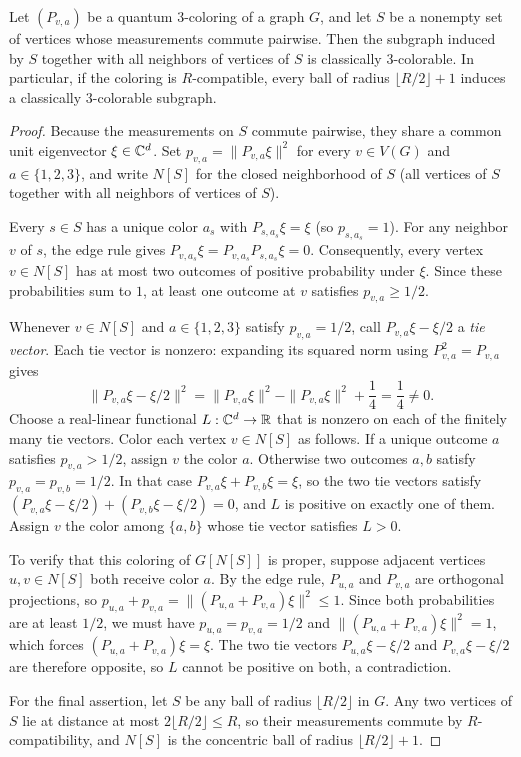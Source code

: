 \begin{lemma}\label{lem:rounding-neighbors}
Let $(P_{v,a})$ be a quantum $3$-coloring of a graph $G$, and let $S$ be a nonempty set of vertices whose measurements commute pairwise. Then the subgraph induced by $S$ together with all neighbors of vertices of $S$ is classically $3$-colorable. In particular, if the coloring is $R$-compatible, every ball of radius $\lfloor R/2\rfloor+1$ induces a classically $3$-colorable subgraph.
\end{lemma}
\begin{proof}
Because the measurements on $S$ commute pairwise, they share a common unit eigenvector $\xi\in\mathbb C^d$. Set $p_{v,a}=\|P_{v,a}\xi\|^2$ for every $v\in V(G)$ and $a\in\{1,2,3\}$, and write $N[S]$ for the closed neighborhood of $S$ (all vertices of $S$ together with all neighbors of vertices of $S$).

Every $s\in S$ has a unique color $a_s$ with $P_{s,a_s}\xi=\xi$ (so $p_{s,a_s}=1$). For any neighbor $v$ of $s$, the edge rule gives $P_{v,a_s}\xi=P_{v,a_s}P_{s,a_s}\xi=0$. Consequently, every vertex $v\in N[S]$ has at most two outcomes of positive probability under $\xi$. Since these probabilities sum to $1$, at least one outcome at $v$ satisfies $p_{v,a}\ge1/2$.

Whenever $v\in N[S]$ and $a\in\{1,2,3\}$ satisfy $p_{v,a}=1/2$, call $P_{v,a}\xi-\xi/2$ a \emph{tie vector}. Each tie vector is nonzero: expanding its squared norm using $P_{v,a}^2=P_{v,a}$ gives
\[
 \|P_{v,a}\xi-\xi/2\|^2=\|P_{v,a}\xi\|^2-\|P_{v,a}\xi\|^2+\frac14=\frac14\ne0.
\]
Choose a real-linear functional $L:\mathbb C^d\to\mathbb R$ that is nonzero on each of the finitely many tie vectors. Color each vertex $v\in N[S]$ as follows. If a unique outcome $a$ satisfies $p_{v,a}>1/2$, assign $v$ the color $a$. Otherwise two outcomes $a,b$ satisfy $p_{v,a}=p_{v,b}=1/2$. In that case $P_{v,a}\xi+P_{v,b}\xi=\xi$, so the two tie vectors satisfy $(P_{v,a}\xi-\xi/2)+(P_{v,b}\xi-\xi/2)=0$, and $L$ is positive on exactly one of them. Assign $v$ the color among $\{a,b\}$ whose tie vector satisfies $L>0$.

To verify that this coloring of $G[N[S]]$ is proper, suppose adjacent vertices $u,v\in N[S]$ both receive color $a$. By the edge rule, $P_{u,a}$ and $P_{v,a}$ are orthogonal projections, so $p_{u,a}+p_{v,a}=\|(P_{u,a}+P_{v,a})\xi\|^2\le1$. Since both probabilities are at least $1/2$, we must have $p_{u,a}=p_{v,a}=1/2$ and $\|(P_{u,a}+P_{v,a})\xi\|^2=1$, which forces $(P_{u,a}+P_{v,a})\xi=\xi$. The two tie vectors $P_{u,a}\xi-\xi/2$ and $P_{v,a}\xi-\xi/2$ are therefore opposite, so $L$ cannot be positive on both, a contradiction.

For the final assertion, let $S$ be any ball of radius $\lfloor R/2\rfloor$ in $G$. Any two vertices of $S$ lie at distance at most $2\lfloor R/2\rfloor\le R$, so their measurements commute by $R$-compatibility, and $N[S]$ is the concentric ball of radius $\lfloor R/2\rfloor+1$.
\end{proof}

